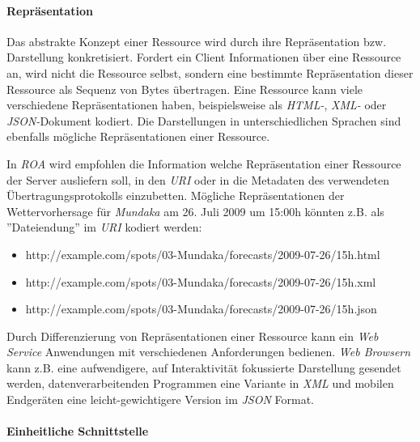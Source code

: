 \paragraph{Repräsentation}

Das abstrakte Konzept einer Ressource wird durch ihre Repräsentation
bzw. Darstellung konkretisiert. Fordert ein Client Informationen über
eine Ressource an, wird nicht die Ressource selbst, sondern eine
bestimmte Repräsentation dieser Ressource als Sequenz von Bytes
übertragen. Eine Ressource kann viele verschiedene Repräsentationen
haben, beispielsweise als \textit{HTML-},
 \textit{XML-} oder
\textit{JSON-}Dokument 
kodiert. Die Darstellungen in unterschiedlichen Sprachen sind
ebenfalls mögliche Repräsentationen einer Ressource.

In \textit{ROA} wird empfohlen die Information welche Repräsentation
einer Ressource der Server ausliefern soll, in den \textit{URI} oder
in die Metadaten des verwendeten Übertragungsprotokolls
einzubetten. Mögliche Repräsentationen der Wettervorhersage für
\textit{Mundaka} am 26. Juli 2009 um 15:00h könnten z.B. als
''Dateiendung'' im \textit{URI} kodiert werden:

{\sf \small
  \begin{itemize}
  \item http://example.com/spots/03-Mundaka/forecasts/2009-07-26/15h.html
  \item http://example.com/spots/03-Mundaka/forecasts/2009-07-26/15h.xml
  \item http://example.com/spots/03-Mundaka/forecasts/2009-07-26/15h.json
  \end{itemize}
}

Durch Differenzierung von Repräsentationen einer Ressource kann ein
\textit{Web Service} Anwendungen mit verschiedenen Anforderungen
bedienen. \textit{Web Browsern} kann z.B. eine aufwendigere, auf
Interaktivität fokussierte Darstellung gesendet werden,
datenverarbeitenden Programmen eine Variante in \textit{XML} und
mobilen Endgeräten eine leicht-gewichtigere Version im \textit{JSON}
Format.

\paragraph{Einheitliche Schnittstelle}

